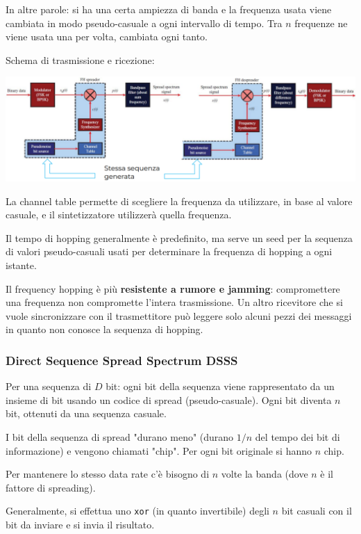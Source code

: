 In altre parole: si ha una certa ampiezza di banda e la frequenza usata viene cambiata in modo pseudo-casuale a ogni intervallo di tempo. Tra $n$ frequenze ne viene usata una per volta, cambiata ogni tanto.

Schema di trasmissione e ricezione:
\begin{center}
	\includegraphics[width=\linewidth]{img/wireless/fhss1}
\end{center}

La channel table permette di scegliere la frequenza da utilizzare, in base al valore casuale, e il sintetizzatore utilizzerà quella frequenza. 

Il tempo di hopping generalmente è predefinito, ma serve un seed per la sequenza di valori pseudo-casuali usati per determinare la frequenza di hopping a ogni istante.

Il frequency hopping è più \textbf{resistente a rumore e jamming}: compromettere una frequenza non compromette l'intera trasmissione. Un altro ricevitore che si vuole sincronizzare con il trasmettitore può leggere solo alcuni pezzi dei messaggi in quanto non conosce la sequenza di hopping. 

\subsubsection{Direct Sequence Spread Spectrum DSSS}
\label{subsub:DSSS}

Per una sequenza di $D$ bit: ogni bit della sequenza viene rappresentato da un insieme di bit usando un codice di spread (pseudo-casuale). Ogni bit diventa $n$ bit, ottenuti da una sequenza casuale.

I bit della sequenza di spread "durano meno" (durano $1/n$ del tempo dei bit di informazione) e vengono chiamati "chip". Per ogni bit originale si hanno $n$ chip.

Per mantenere lo stesso data rate c'è bisogno di $n$ volte la banda (dove $n$ è il fattore di spreading).

Generalmente, si effettua uno \texttt{xor} (in quanto invertibile) degli $n$ bit casuali con il bit da inviare e si invia il risultato. 

